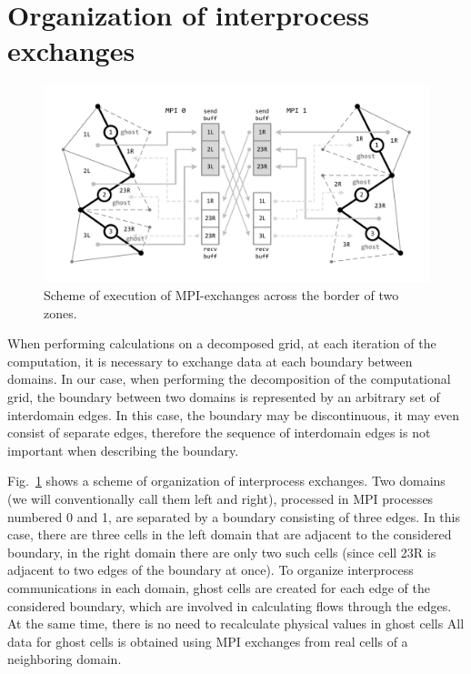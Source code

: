 \documentclass[
11pt,%
tightenlines,%
twoside,%
onecolumn,%
nofloats,%
nobibnotes,%
nofootinbib,%
superscriptaddress,%
noshowpacs,%
centertags]%
{revtex4}
\begin{document}
\section{Organization of interprocess exchanges}

\begin{figure}[h]
\includegraphics[width=1.0\textwidth]{pics/04-MPI.pdf}
\caption{Scheme of execution of MPI-exchanges across the border of two zones.}\label{fig:04-MPI}
\end{figure}

When performing calculations on a decomposed grid, at each iteration of the computation, it is necessary to exchange data at each boundary between domains.
In our case, when performing the decomposition of the computational grid, the boundary between two domains is represented by an arbitrary set of interdomain edges.
In this case, the boundary may be discontinuous, it may even consist of separate edges, therefore the sequence of interdomain edges is not important when describing the boundary.

Fig.~\ref{fig:04-MPI} shows a scheme of organization of interprocess exchanges.
Two domains (we will conventionally call them left and right), processed in MPI processes numbered 0 and 1, are separated by a boundary consisting of three edges.
In this case, there are three cells in the left domain that are adjacent to the considered boundary, in the right domain there are only two such cells (since cell 23R is adjacent to two edges of the boundary at once).
To organize interprocess communications in each domain, ghost cells are created for each edge of the considered boundary, which are involved in calculating flows through the edges.
At the same time, there is no need to recalculate physical values in ghost cells
All data for ghost cells is obtained using MPI exchanges from real cells of a neighboring domain.
\end{document}

